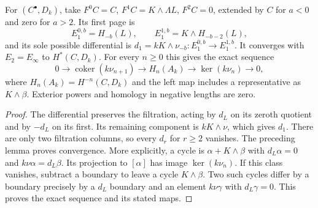 \begin{proposition}
\label{prop:km-central-filtration}
For $(C^\bullet,D_k)$, take
$F^0C=C$, $F^1C=K\wedge\Lambda L$, $F^2C=0$, extended by $C$ for
$a<0$ and zero for $a>2$.  Its first page is
\[
E_1^{0,b}=H_{-b}(L),\qquad
E_1^{1,b}=K\wedge H_{-b-2}(L),
\]
and its sole possible differential is
$d_1=kK\wedge\nu_{-b}:E_1^{0,b}\to E_1^{1,b}$.
It converges with $E_2=E_\infty$ to $H^*(C,D_k)$.
For every $n\ge0$ this gives the exact sequence
\[
0\longrightarrow\operatorname{coker}(k\nu_{n+1})
\longrightarrow H_n(A_k)
\longrightarrow\ker(k\nu_n)\longrightarrow0,
\]
where $H_n(A_k)=H^{-n}(C,D_k)$ and the left map includes a representative
as $K\wedge\beta$.  Exterior powers and homology in negative lengths are zero.
\end{proposition}
\begin{proof}
The differential preserves the filtration, acting by $d_L$ on its zeroth
quotient and by $-d_L$ on its first.  Its remaining component is
$kK\wedge\nu$, which gives $d_1$.  There are only two filtration columns,
so every $d_r$ for $r\ge2$ vanishes.  The preceding lemma proves convergence.
More explicitly, a cycle is $\alpha+K\wedge\beta$ with
$d_L\alpha=0$ and $k\nu\alpha=d_L\beta$.
Its projection to $[\alpha]$ has image $\ker(k\nu_n)$.
If this class vanishes, subtract a boundary to leave a cycle $K\wedge\beta$.
Two such cycles differ by a boundary precisely by a $d_L$ boundary and
an element $k\nu\gamma$ with $d_L\gamma=0$.
This proves the exact sequence and its stated maps.
\end{proof}

